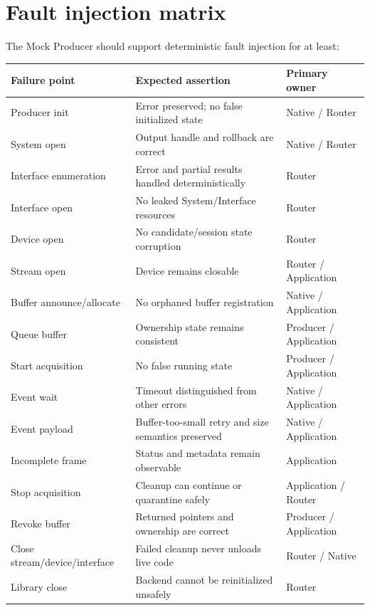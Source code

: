 \documentclass[11pt,a4paper]{report}
\begin{document}
\section{Fault injection matrix}
The Mock Producer should support deterministic fault injection for at least:
\begin{longtable}{p{}p{}p{}}
\toprule
Failure point & Expected assertion & Primary owner \\
\midrule
Producer init & Error preserved; no false initialized state & Native / Router \\
System open & Output handle and rollback are correct & Native / Router \\
Interface enumeration & Error and partial results handled deterministically & Router \\
Interface open & No leaked System/Interface resources & Router \\
Device open & No candidate/session state corruption & Router \\
Stream open & Device remains closable & Router / Application \\
Buffer announce/allocate & No orphaned buffer registration & Native / Application \\
Queue buffer & Ownership state remains consistent & Producer / Application \\
Start acquisition & No false running state & Producer / Application \\
Event wait & Timeout distinguished from other errors & Native / Application \\
Event payload & Buffer-too-small retry and size semantics preserved & Native / Application \\
Incomplete frame & Status and metadata remain observable & Application \\
Stop acquisition & Cleanup can continue or quarantine safely & Application / Router \\
Revoke buffer & Returned pointers and ownership are correct & Producer / Application \\
Close stream/device/interface & Failed cleanup never unloads live code & Router / Native \\
Library close & Backend cannot be reinitialized unsafely & Router \\
\bottomrule
\end{longtable}
\end{document}
